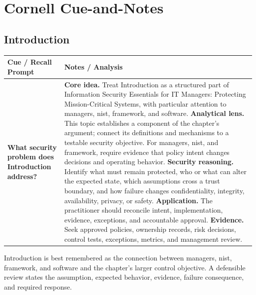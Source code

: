 \documentclass[11pt]{article}
\newcommand{\CornellHeader}{%
\rowcolor{Navy}\color{white}\bfseries Cue / Recall Prompt & \color{white}\bfseries Notes / Analysis\\\hline}
\newcommand{\CornellRow}[2]{%
\cellcolor{CueGray}\RaggedRight\textbf{#1} & \RaggedRight #2\\\hline}
\begin{document}
\section*{Cornell Cue-and-Notes}
\subsection*{Introduction}
\begin{longtable}{>{\RaggedRight\arraybackslash}p{}|>{\RaggedRight\arraybackslash}p{}}
\CornellHeader
\CornellRow{What security problem does Introduction address?}{\textbf{Core idea.} Treat Introduction as a structured part of Information Security Essentials for IT Managers: Protecting Mission-Critical Systems, with particular attention to managers, nist, framework, and software. \textbf{Analytical lens.} This topic establishes a component of the chapter's argument; connect its definitions and mechanisms to a testable security objective. For managers, nist, and framework, require evidence that policy intent changes decisions and operating behavior. \textbf{Security reasoning.} Identify what must remain protected, who or what can alter the expected state, which assumptions cross a trust boundary, and how failure changes confidentiality, integrity, availability, privacy, or safety. \textbf{Application.} The practitioner should reconcile intent, implementation, evidence, exceptions, and accountable approval. \textbf{Evidence.} Seek approved policies, ownership records, risk decisions, control tests, exceptions, metrics, and management review.}
\end{longtable}
\begin{topicsummary}
Introduction is best remembered as the connection between managers, nist, framework, and software and the chapter's larger control objective. A defensible review states the assumption, expected behavior, evidence, failure consequence, and required response.
\end{topicsummary}
\end{document}
